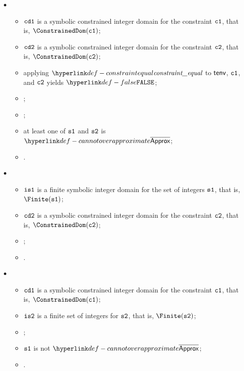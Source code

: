 \begin{itemize}
  \item {}
  \begin{itemize}
    \item $\texttt{cd1}$ is a symbolic constrained integer domain for the constraint $\vcone$, that is, $\ConstrainedDom(\vcone)$;
    \item $\texttt{cd2}$ is a symbolic constrained integer domain for the constraint $\vctwo$, that is, $\ConstrainedDom(\vctwo)$;
    \item applying $\constraintequal$ to $\tenv$, $\vcone$, and $\vctwo$ yields $\False$;
    \item \Proseapproxconstraint{$\tenv$}{$\vcone$}{$\Over$}{$\vsone$};
    \item \Proseapproxconstraint{$\tenv$}{$\vctwo$}{$\Under$}{$\vstwo$};
    \item at least one of $\vsone$ and $\vstwo$ is $\CannotOverapproximate$;
    \item \Proseeqdef{$\vb$}{$\False$}.
  \end{itemize}

  \item {}
  \begin{itemize}
    \item $\texttt{is1}$ is a finite symbolic integer domain for the set of integers $\vsone$, that is, $\Finite(\vsone)$;
    \item $\texttt{cd2}$ is a symbolic constrained integer domain for the constraint $\vctwo$, that is, $\ConstrainedDom(\vctwo)$;
    \item \ProseapproxconstraintsUnder{$\tenv$}{$\vctwo$}{$\vstwo$};
    \item {}.
  \end{itemize}

  \item {}
  \begin{itemize}
    \item $\texttt{cd1}$ is a symbolic constrained integer domain for the constraint $\vcone$, that is, $\ConstrainedDom(\vcone)$;
    \item $\texttt{is2}$ is a finite set of integers for $\vstwo$, that is, $\Finite(\vstwo)$;
    \item \ProseapproxconstraintsOver{$\tenv$}{$\vcone$}{$\vsone$};
    \item $\vsone$ is not $\CannotOverapproximate$;
    \item {}.
  \end{itemize}


\end{itemize}

